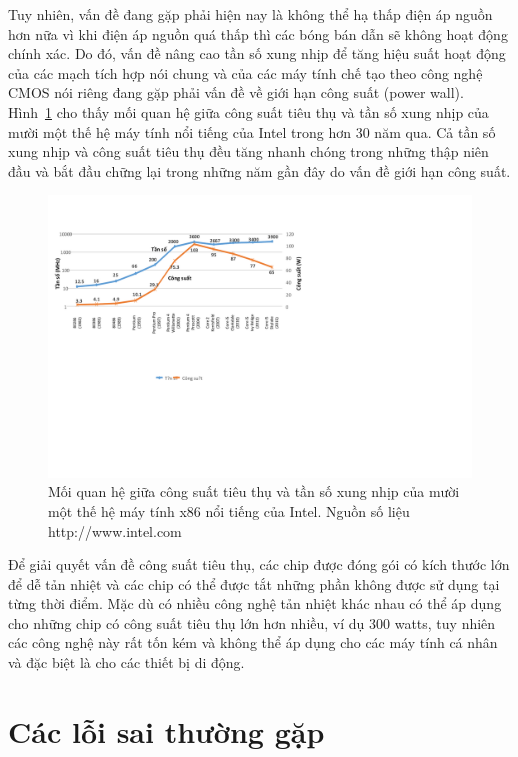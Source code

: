 Tuy nhiên, vấn đề đang gặp phải hiện nay là không thể hạ thấp điện áp nguồn hơn nữa vì khi điện áp nguồn quá thấp thì các bóng bán dẫn sẽ không hoạt động chính xác. Do đó, vấn đề nâng cao tần số xung nhịp để tăng hiệu suất hoạt động của các mạch tích hợp nói chung và của các máy tính chế tạo theo công nghệ CMOS nói riêng đang gặp phải vấn đề về giới hạn công suất (power wall). Hình~\ref{fig:power} cho thấy mối quan hệ giữa công suất tiêu thụ và tần số xung nhịp của mười một thế hệ máy tính nổi tiếng của Intel trong hơn 30 năm qua. Cả tần số xung nhịp và công suất tiêu thụ đều tăng nhanh chóng trong những thập niên đầu và bắt đầu chững lại trong những năm gần đây do vấn đề giới hạn công suất.

\begin{figure}[!h]
	\centering
		\includegraphics[width=0.95\columnwidth]{chapter01/figure/power}
		\centering
	\caption{Mối quan hệ giữa công suất tiêu thụ và tần số xung nhịp của mười một thế hệ máy tính x86 nổi tiếng của Intel. Nguồn số liệu http://www.intel.com}
	\label{fig:power}
\end{figure}

Để giải quyết vấn đề công suất tiêu thụ, các chip được đóng gói có kích thước lớn để dễ tản nhiệt và các chip có thể được tắt những phần không được sử dụng tại từng thời điểm. Mặc dù có nhiều công nghệ tản nhiệt khác nhau có thể áp dụng cho những chip có công suất tiêu thụ lớn hơn nhiều, ví dụ 300 watts, tuy nhiên các công nghệ này rất tốn kém và không thể áp dụng cho các máy tính cá nhân và đặc biệt là cho các thiết bị di động.

\section{Các lỗi sai thường gặp}

